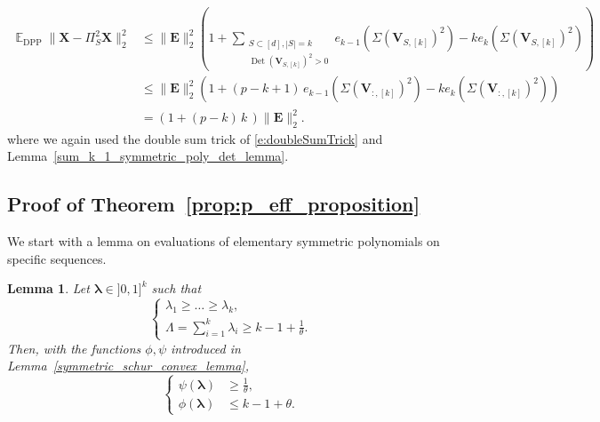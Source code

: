 \documentclass[twoside,11pt]{book}
\newtheorem{lemma}{Lemma}
\numberwithin{theorem}{chapter}
\numberwithin{definition}{chapter}
\numberwithin{proposition}{chapter}
\numberwithin{corollary}{chapter}
\numberwithin{example}{chapter}
\numberwithin{lemma}{chapter}
\numberwithin{assumption}{chapter}
\numberwithin{equation}{chapter}
\numberwithin{figure}{chapter}
\DeclareMathOperator{\Det}{Det}
\DeclareMathOperator{\DPP}{\mathrm{DPP}}
\DeclareMathOperator{\EX}{\mathbb{E}}
\begin{document}
\begin{align*}
    \EX_{\DPP} \| \bm{X} - \Pi_{S}^{2}\bm{X} \|_{2}^{2} & \leq  \| \bm{E}\|_{2}^{2} \left(1+\sum_{\substack{S \subset [d], |S| = k\\ \Det(\bm{V}_{S,[k]})^{2}>0}} e_{k-1}(\Sigma(\bm{V}_{S,[k]})^{2}) - k e_{k}(\Sigma(\bm{V}_{S,[k]})^{2}) \right)\\
    & \leq \| \bm{E}\|_{2}^{2} \left( 1+ (p-k+1)\,e_{k-1}(\Sigma(\bm{V}_{:,[k]})^{2}) - k e_{k}(\Sigma(\bm{V}_{:,[k]})^{2}) \right)\,\\
    &= (1+(p-k)\,k\,)\| \bm{E}\|_{2}^{2}.
\end{align*}
where we again used the double sum trick of \eqref{e:doubleSumTrick} and Lemma~\ref{sum_k_1_symmetric_poly_det_lemma}.%



\subsection{Proof of Theorem~\ref{prop:p_eff_proposition}}
\label{s:proofOfEffectiveSparsitySetting}
We start with a lemma on evaluations of elementary symmetric polynomials on specific sequences.
\begin{lemma}\label{lemma_k_minus_half}
Let $\bm{\lambda}\in ]0,1]^{k}$ such that
\begin{equation}
	\left\{
	\begin{array}{l}
	    \lambda_{1} \geq \dots \geq \lambda_{k},\\
		\label{eq:lambda_schur_hypo}
   		\Lambda = \sum\limits_{i=1}^{k} \lambda_{i} \geq k-1 + \frac{1}{\theta}.
	\end{array}
	\right.
\end{equation}
Then, with the functions $\phi,\psi$ introduced in Lemma~\ref{symmetric_schur_convex_lemma}, %
\begin{equation}
    \left\{
    \begin{array}{ll}
    	\psi(\bm{\lambda})  & \displaystyle{\geq \frac{1}{\theta},}\\
	\phi(\bm{\lambda})  & \leq k-1 +\theta.
    \end{array}
    \right.
\end{equation}


\end{lemma}
\end{document}
